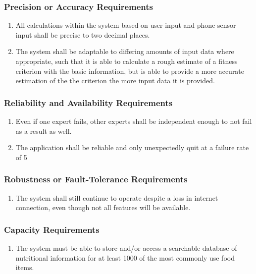 \documentclass[12pt,letterpaper]{article}
\begin{document}
\subsubsection{Precision or Accuracy Requirements}
\label{ssub:precision_or_accuracy_requirements}
\begin{enumerate}[{PR-PA}1. ]
	\item All calculations within the system based on user input and phone sensor input shall be precise to two decimal places.
	
	\item The system shall be adaptable to differing amounts of input data where appropriate, such that it is able to calculate a rough estimate of a fitness criterion with the basic information, but is able to provide a more accurate estimation of the the criterion the more input data it is provided.
\end{enumerate}

\subsubsection{Reliability and Availability Requirements}
\label{ssub:reliability_and_availability_requirements}
\begin{enumerate}[{PR-RA}1. ]
	\item Even if one expert fails, other experts shall be independent enough to not fail as a result as well.
	
	\item The application shall be reliable and only unexpectedly quit at a failure rate of 5%
\end{enumerate}

\subsubsection{Robustness or Fault-Tolerance Requirements}
\label{ssub:robustness_or_fault_tolerance_requirements}
\begin{enumerate}[{PR-RF}1. ]
	\item The system shall still continue to operate despite a loss in internet connection, even though not all features will be available.
\end{enumerate}

\subsubsection{Capacity Requirements}
\label{ssub:capacity_requirements}
\begin{enumerate}[{PR-C}1. ]
	\item The system must be able to store and/or access a searchable database of nutritional information for at least 1000 of the most commonly use food items.
\end{enumerate}
\end{document}

